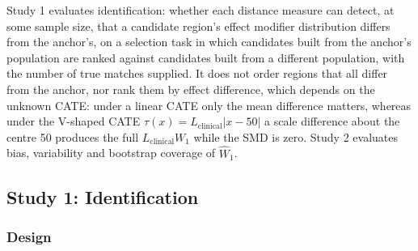 \documentclass[AMA,Times1COL]{WileyNJDv5}
\begin{document}
Study 1 evaluates identification: whether each distance measure can detect, at some sample size, that a candidate region's effect modifier distribution differs from the anchor's, on a selection task in which candidates built from the anchor's population are ranked against candidates built from a different population, with the number of true matches supplied. It does not order regions that all differ from the anchor, nor rank them by effect difference, which depends on the unknown CATE: under a linear CATE only the mean difference matters, whereas under the V-shaped CATE $\tau(x) = L_{\text{clinical}} |x - 50|$ a scale difference about the centre 50 produces the full $L_{\text{clinical}} W_1$ while the SMD is zero. Study 2 evaluates bias, variability and bootstrap coverage of $\widehat{W}_1$.


\subsection{Study 1: Identification}\label{sec:study1}


\subsubsection{Design}\label{sec:study1_design}
\end{document}
